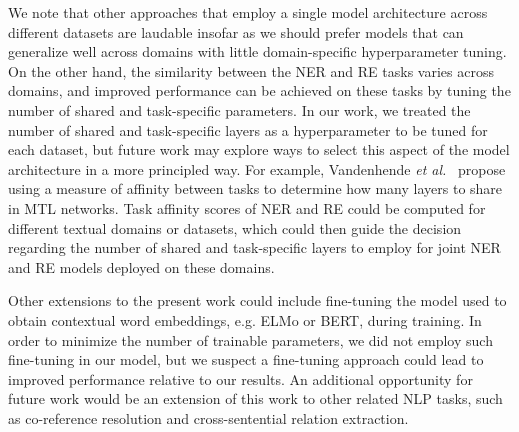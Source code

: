 \documentclass{article}
\begin{document}
We note that other approaches that employ a single model architecture across different datasets are laudable insofar as we should prefer models that can generalize well across domains with little domain-specific hyperparameter tuning. On the other hand, the similarity between the NER and RE tasks varies across domains, and improved performance can be achieved on these tasks by tuning the number of shared and task-specific parameters. In our work, we treated the number of shared and task-specific layers as a hyperparameter to be tuned for each dataset, but future work may explore ways to select this aspect of the model architecture in a more principled way. For example, Vandenhende {\em et al.}~ propose using a measure of affinity between tasks to determine how many layers to share in MTL networks. Task affinity scores of NER and RE could be computed for different textual domains or datasets, which could then guide the decision regarding the number of shared and task-specific layers to employ for joint NER and RE models deployed on these domains.  

Other extensions to the present work could include fine-tuning the model used to obtain contextual word embeddings, e.g. ELMo or BERT, during training. In order to minimize the number of trainable parameters, we did not employ such fine-tuning in our model, but we suspect a fine-tuning approach could lead to improved performance relative to our results. An additional opportunity for future work would be an extension of this work to other related NLP tasks, such as co-reference resolution and cross-sentential relation extraction.



\end{document}
